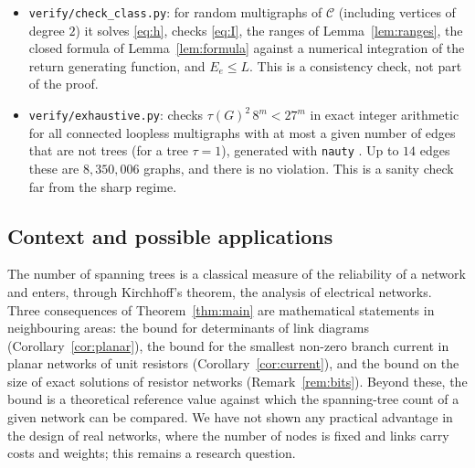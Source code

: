 \documentclass[11pt]{amsart}
\theoremstyle{plain}
\theoremstyle{remark}
\newcommand{\cC}{\mathcal{C}}
\newcommand{\code}[1]{\texttt{#1}}
\begin{document}
\begin{itemize}
\begin{sloppypar}
  replays the $29$ modules in the kernel checker; a recorded clean-room run with three negative controls is
  included (\code{VERIFICATION\_CLEANROOM.txt}, with the raw outputs in \code{logs/}). The file
  \code{PROOF\_ROUTE.md} lists the steps with the names of the Lean theorems.\end{sloppypar}
\item \code{verify/check\_class.py}: for random multigraphs of $\cC$ (including vertices of degree $2$) it solves
  \eqref{eq:h}, checks \eqref{eq:I}, the ranges of Lemma~\ref{lem:ranges}, the closed formula of
  Lemma~\ref{lem:formula} against a numerical integration of the return generating function, and
  $E_e\le L$. This is a consistency check, not part of the proof.
\item \code{verify/exhaustive.py}: checks $\tau(G)^2\,8^m<27^m$ in exact integer arithmetic for all connected
  loopless multigraphs with at most a given number of edges that are not trees (for a tree $\tau=1$), generated
  with \code{nauty} \cite{nauty}. Up to $14$ edges these are $8{,}350{,}006$ graphs, and there is no violation. This
  is a sanity check far from the sharp regime.
\end{itemize}

\subsection*{Context and possible applications}
The number of spanning trees is a classical measure of the reliability of a network and enters, through
Kirchhoff's theorem, the analysis of electrical networks. Three consequences of Theorem~\ref{thm:main} are
mathematical statements in neighbouring areas: the bound for determinants of link diagrams
(Corollary~\ref{cor:planar}), the bound for the smallest non-zero branch current in planar networks of unit
resistors (Corollary~\ref{cor:current}), and the bound on the size of exact solutions of resistor networks
(Remark~\ref{rem:bits}). Beyond these, the bound is a theoretical reference value against which the spanning-tree
count of a given network can be compared. We have not shown any practical advantage in the design of real networks,
where the number of nodes is fixed and links carry costs and weights; this remains a research question.
\end{document}
